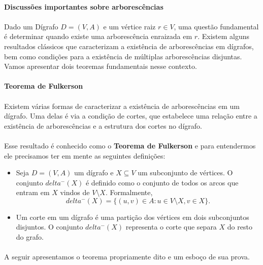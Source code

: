 \documentclass[12pt,a4paper]{article}
\def\delta{delta}%
\begin{document}
\paragraph{Discussões importantes sobre arborescências}

\paragraph{}
Dado um Dígrafo \(D = (V, A)\) e um vértice raiz \(r \in V\), uma questão fundamental é determinar quando existe uma arborescência enraizada em \(r\).
Existem alguns resultados clássicos que caracterizam a existência de arborescências em dígrafos, bem como condições para a existência de múltiplas arborescências disjuntas. Vamos apresentar dois teoremas fundamentais nesse contexto.

\paragraph{Teorema de Fulkerson}

\paragraph{}
Existem várias formas de caracterizar a existência de arborescências em um dígrafo. Uma delas é via a condição de cortes, que estabelece uma relação entre a existência de arborescências e a estrutura dos cortes no dígrafo.

\paragraph{}
Esse resultado é conhecido como o \textbf{Teorema de Fulkerson} e para entendermos ele precisamos ter em mente as seguintes definições:

\begin{itemize}
    \item Seja \(D = (V, A)\) um dígrafo e \(X \subseteq V\) um subconjunto de vértices. O conjunto \(\delta^-(X)\) é definido como o conjunto de todos os arcos que entram em \(X\) vindos de \(V \setminus X\). Formalmente,
    \[
    \delta^-(X) = \{(u, v) \in A : u \in V \setminus X, v \in X\}.
    \]
    \item Um corte em um dígrafo é uma partição dos vértices em dois subconjuntos disjuntos. O conjunto \(\delta^-(X)\) representa o corte que separa \(X\) do resto do grafo.
\end{itemize}

\paragraph{}
A seguir apresentamos o teorema propriamente dito e um esboço de sua prova.
\end{document}
